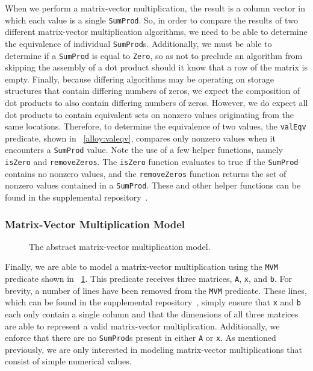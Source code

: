 When we perform a matrix-vector multiplication, the result is a column vector in which each value is a single \texttt{SumProd}.  So, in order to compare the results of two different matrix-vector multiplication algorithms, we need to be able to determine the equivalence of individual \texttt{SumProd}s.  Additionally, we must be able to determine if a \texttt{SumProd} is equal to \texttt{Zero}, so as not to preclude an algorithm from skipping the assembly of a dot product should it know that a row of the matrix is empty.  Finally, because differing algorithms may be operating on storage structures that contain differing numbers of zeros, we expect the composition of dot products to also contain differing numbers of zeros.  However, we do expect all dot products to contain equivalent sets on nonzero values originating from the same locations.  Therefore, to determine the equivalence of two values, the \texttt{valEqv} predicate, shown in \figurename~\ref{alloy:valeqv}, compares only nonzero values when it encounters a \texttt{SumProd} value.  Note the use of a few helper functions, namely \texttt{isZero} and \texttt{removeZeros}.  The \texttt{isZero} function evaluates to true if the \texttt{SumProd} contains no nonzero values, and the \texttt{removeZeros} function returns the set of nonzero values contained in a \texttt{SumProd}.  These and other helper functions can be found in the supplemental repository~\cite{repository}.

\subsubsection{Matrix-Vector Multiplication Model}
\label{sec:abstractmvm}

\begin{figure}

\caption{The abstract matrix-vector multiplication model.}
\label{alloy:mvmabs}
\end{figure}

Finally, we are able to model a matrix-vector multiplication using the \texttt{MVM} predicate shown in \figurename~\ref{alloy:mvmabs}.  This predicate receives three matrices, \texttt{A}, \texttt{x}, and \texttt{b}.
For brevity, a number of lines have been removed from the \texttt{MVM} predicate.  These lines, which can be found in the supplemental repository~\cite{repository}, simply ensure that \texttt{x} and \texttt{b} each only contain a single column and that the dimensions of all three matrices are able to represent a valid matrix-vector multiplication.
Additionally, we enforce that there are no \texttt{SumProd}s present in either \texttt{A} or \texttt{x}.  As mentioned previously, we are only interested in modeling matrix-vector multiplications that consist of simple numerical values.

